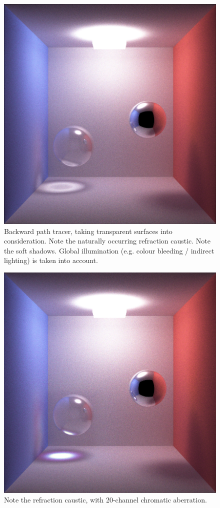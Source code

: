 \documentclass[12pt]{article}
\begin{document}
\begin{figure} 
\centering
  \includegraphics[width = 6 in]{fig5.png}
  \caption{  Backward path tracer, taking transparent surfaces into consideration. 
Note the naturally occurring refraction caustic.
Note the soft shadows.
Global illumination (e.g. colour bleeding / indirect lighting) is taken into account.
}
\end{figure}


\begin{figure} 
\centering
  \includegraphics[width = 6 in]{fig6.png}
  \caption{ Note the refraction caustic, with 20-channel chromatic aberration.
}
\end{figure}
\end{document}
